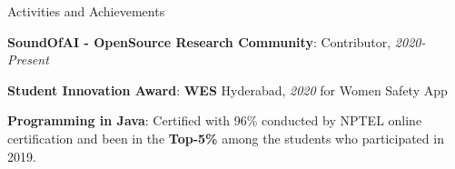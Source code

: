 \documentclass[8pt]{resume} %
\begin{document}
\begin{rSection}{Activities and Achievements}

    {\bf SoundOfAI - OpenSource Research Community}: Contributor, {\em 2020-Present}


    {\bf  Student Innovation Award}: {\bf WES} Hyderabad, {\em 2020} for Women Safety App

{\bf  Programming in Java}: Certified with 96\% conducted by NPTEL online certification and been in the {\bf Top-5\%} among the students who participated in 2019.


\end{rSection}
\end{document}

